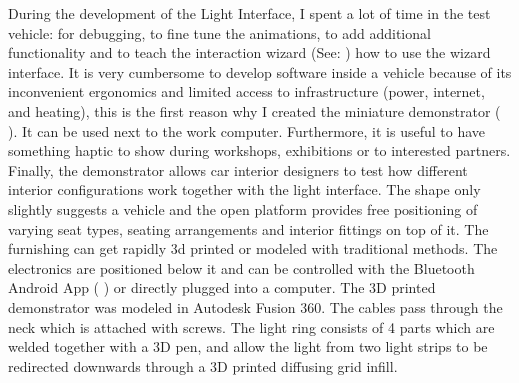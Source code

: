 During the development of the Light Interface, I spent a lot of time in the test vehicle: for debugging, to fine tune the animations, to add additional functionality and to teach the interaction wizard (See: ) how to use the wizard interface. It is very cumbersome to develop software inside a vehicle because of its inconvenient ergonomics and limited access to infrastructure (power, internet, and heating), this is the first reason why I created the miniature demonstrator ( ). It can be used next to the work computer. Furthermore, it is useful to have something haptic to show during workshops, exhibitions or to interested partners. Finally, the demonstrator allows car interior designers to test how different interior configurations work together with the light interface. The shape only slightly suggests a vehicle and the open platform provides free positioning of varying seat types, seating arrangements and interior fittings on top of it. The furnishing can get rapidly 3d printed or modeled with traditional methods. The electronics are positioned below it and can be controlled with the Bluetooth Android App ( ) or directly plugged into a computer. The 3D printed demonstrator was modeled in Autodesk Fusion 360. The cables pass through the neck which is attached with screws. The light ring consists of 4 parts which are welded together with a 3D pen, and allow the light from two light strips to be redirected downwards through a 3D printed diffusing grid infill. 
